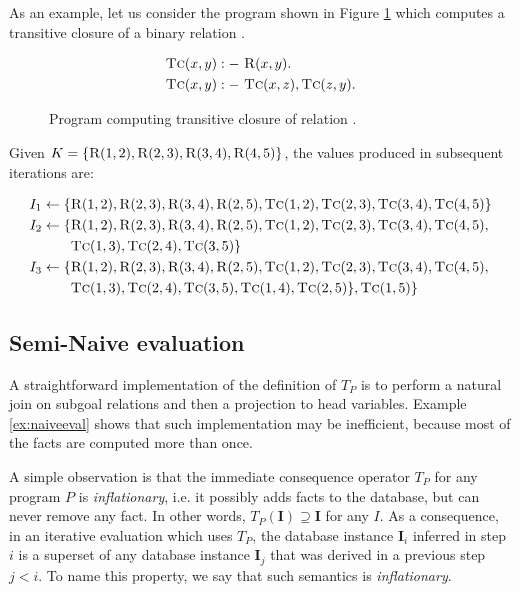 \begin{exmp}
As an example, let us consider the program shown in Figure \ref{ex:tcofr} which computes a transitive closure of a binary relation .
\begin{figure}[!htbp]
\begin{align*}
\textsc{Tc}(x, y) &:-~ \textsc{R}(x, y).\\
\textsc{Tc}(x, y) &:-~ \textsc{Tc}(x, z), \textsc{Tc}(z, y).
\end{align*}
\caption{Program computing transitive closure of relation \label{ex:tcofr}.}
\end{figure}

Given $K = \{\textsc{R}(1, 2), \textsc{R}(2, 3), \textsc{R}(3, 4), \textsc{R}(4, 5)\}$, the values produced in subsequent iterations are:

\begin{align*}
I_1 \leftarrow \{&\textsc{R}(1, 2), \textsc{R}(2, 3), \textsc{R}(3, 4), \textsc{R}(2, 5), \textsc{Tc}(1, 2), \textsc{Tc}(2, 3), \textsc{Tc}(3, 4), \textsc{Tc}(4, 5)\}\\
I_2 \leftarrow \{&\textsc{R}(1, 2), \textsc{R}(2, 3), \textsc{R}(3, 4), \textsc{R}(2, 5), \textsc{Tc}(1, 2), \textsc{Tc}(2, 3), \textsc{Tc}(3, 4), \textsc{Tc}(4, 5), \\
&\textsc{Tc}(1, 3), \textsc{Tc}(2, 4), \textsc{Tc}(3, 5)\}\\
I_3 \leftarrow \{&\textsc{R}(1, 2), \textsc{R}(2, 3), \textsc{R}(3, 4), \textsc{R}(2, 5), \textsc{Tc}(1, 2), \textsc{Tc}(2, 3), \textsc{Tc}(3, 4), \textsc{Tc}(4, 5),\\
& \textsc{Tc}(1, 3), \textsc{Tc}(2, 4), \textsc{Tc}(3, 5), \textsc{Tc}(1, 4), \textsc{Tc}(2, 5)\}, \textsc{Tc}(1, 5)\}\\
\end{align*}
\label{ex:naiveeval}
\end{exmp}

\subsection{Semi-Naive evaluation}\label{ss:seminaiveevaldatalog}
A straightforward implementation of the definition of $T_P$ is to perform a natural join on subgoal relations and then a projection to head variables. Example \ref{ex:naiveeval} shows that such implementation may be inefficient, because most of the facts are computed more than once.

A simple observation is that the immediate consequence operator $T_P$ for any program $P$ is \emph{inflationary}, i.e. it possibly adds facts to the database, but can never remove any fact. In other words, $T_P(\textbf{I}) \supseteq \textbf{I}$ for any $I$. As a consequence, in an iterative evaluation which uses $T_P$, the database instance $\textbf{I}_i$ inferred in step $i$ is a superset of any database instance $\textbf{I}_j$ that was derived in a previous step $j < i$. To name this property, we say that such semantics is \emph{inflationary}.


